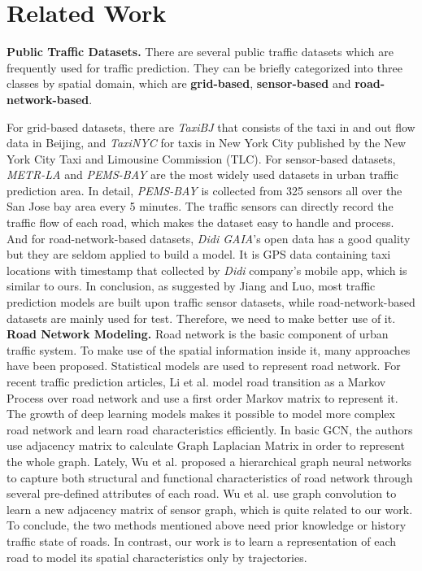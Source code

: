 
\section{Related Work}
\textbf{Public Traffic Datasets.} There are several public traffic datasets which are frequently used for traffic prediction. They can be briefly categorized into three classes by spatial domain, which are \textbf{grid-based}, \textbf{sensor-based} and \textbf{road-network-based}.

For grid-based datasets, there are \textit{TaxiBJ}\cite{taxibj} that consists of the taxi in and out flow data in Beijing, and \textit{TaxiNYC} for taxis in New York City published by the New York City Taxi and Limousine Commission (TLC). For sensor-based datasets, \textit{METR-LA}\cite{DCRNN} and \textit{PEMS-BAY} are the most widely used datasets in urban traffic prediction area. In detail, \textit{PEMS-BAY} is collected from 325 sensors all over the San Jose bay area every 5 minutes. The traffic sensors can directly record the traffic flow of each road, which makes the dataset easy to handle and process. And for road-network-based datasets, \textit{Didi GAIA}'s open data has a good quality but they are seldom applied to build a model. It is GPS data containing taxi locations with timestamp that collected by \textit{Didi} company's mobile app, which is similar to ours. In conclusion, as suggested by Jiang and Luo\cite{surveyGNN}, most traffic prediction models are built upon traffic sensor datasets, while road-network-based datasets are mainly used for test. Therefore, we need to make better use of it.
~\\

\textbf{Road Network Modeling.} Road network is the basic component of urban traffic system. To make use of the spatial information inside it, many approaches have been proposed. Statistical models are used to represent road network. For recent traffic prediction articles, Li et al.\cite{AAAI21} model road transition as a Markov Process over road network and use a first order Markov matrix to represent it. The growth of deep learning models makes it possible to model more complex road network and learn road characteristics efficiently. In basic GCN\cite{GCN0}, the authors use adjacency matrix to calculate Graph Laplacian Matrix in order to represent the whole graph. Lately, Wu et al.\cite{roadrep} proposed a hierarchical graph neural networks to capture both structural and functional characteristics of road network through several pre-defined attributes of each road. Wu et al.\cite{GWNET} use graph convolution to learn a new adjacency matrix of sensor graph, which is quite related to our work. To conclude, the two methods mentioned above need prior knowledge or history traffic state of roads. In contrast, our work is to learn a representation of each road to model its spatial characteristics only by trajectories.
~\\

